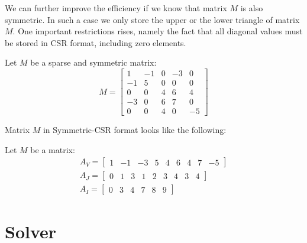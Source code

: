 \documentclass[en]{minipw} %
\begin{document}
We can further improve the efficiency if we know that matrix $M$ is also symmetric. In such a case we only store the upper or the lower triangle of matrix $M$. One important restrictions rises, namely the fact that all diagonal values must be stored in CSR format, including zero elements.

\begin{example}
Let $M$ be a sparse and symmetric matrix:
\begin{equation}
M =
\begin{bmatrix}
1 & -1 & 0 & -3 & 0 \\
-1 & 5 & 0 & 0 & 0 \\
0 & 0 & 4 & 6 & 4 \\
-3 & 0 & 6 & 7 & 0 \\
0 & 0 & 4 & 0 & -5
\end{bmatrix}
\end{equation}

Matrix $M$ in Symmetric-CSR format looks like the following:

Let $M$ be a matrix:
\begin{equation}
\begin{aligned}
A_{V} =
\begin{bmatrix}
1 & -1 & -3 & 5 & 4 & 6 & 4 & 7 & -5
\end{bmatrix}
\\
A_{J} =
\begin{bmatrix}
0 & 1 & 3 & 1 & 2 &3 & 4 & 3 & 4
\end{bmatrix}
\\
A_{I} =
\begin{bmatrix}
0 & 3 & 4 & 7 & 8 & 9
\end{bmatrix}
\end{aligned}
\end{equation}

\end{example}

\section{Solver}
\end{document}

